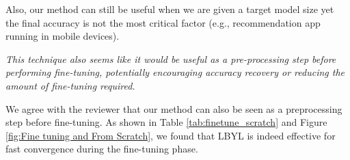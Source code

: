 Also, our method can still be useful when we are given a target model size yet the final accuracy is not the most critical factor (e.g., recommendation app running in mobile devices).

\textit{This technique also seems like it would be useful as a pre-processing step before performing fine-tuning, potentially encouraging accuracy recovery or reducing the amount of fine-tuning required.}

We agree with the reviewer that our method can also be seen as a preprocessing step before fine-tuning. As shown in Table \ref{tab:finetune_scratch} and Figure \ref{fig:Fine tuning and From Scratch}, we found that LBYL is indeed effective for fast convergence during the fine-tuning phase. 














